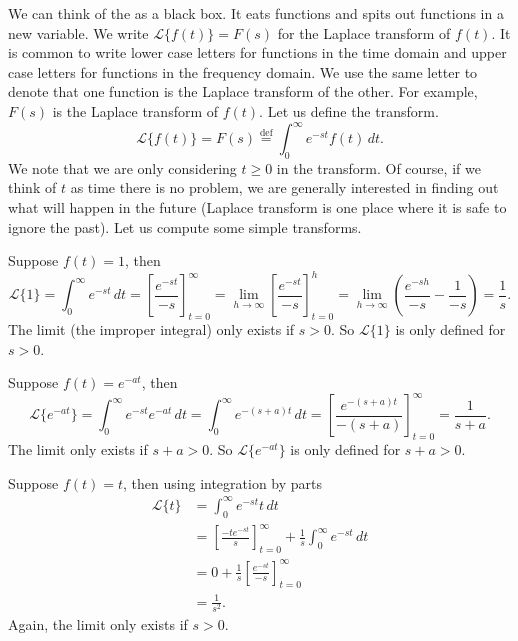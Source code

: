 We can think of the \emph{} as a black box.  It
eats functions and spits out functions in a new variable.  We write
$\mathcal{L} \bigl\{ f(t) \bigr\} = F(s)$ for the Laplace transform of $f(t)$.
It is common to write lower case letters for
functions in the time domain and upper case letters for functions in the
frequency domain.  We use the same letter to denote that one function
is the Laplace transform of the other.  For example, $F(s)$ is the Laplace
transform of $f(t)$.  Let us define the transform.
\begin{equation*}
\mathcal{L} \bigl\{ f(t) \bigr\} =
F(s) \overset{\text{def}}{=} \int_0^\infty e^{-st} f(t) \, dt .
\end{equation*}
We note that we are only considering $t \geq 0$ in the transform.  Of course,
if we think of $t$ as time there is no problem, we are generally interested in
finding out what will happen in the future (Laplace transform is one place
where it is safe to ignore the past).  Let us compute some simple
transforms.

\begin{example}
Suppose $f(t) = 1$, then
\begin{equation*}
\mathcal{L} \{1\} = \int_0^\infty e^{-st} \, dt
=
\left[ \frac{e^{-st}}{-s} \right]_{t=0}^\infty
=
\lim_{h\to\infty}
\left[ \frac{e^{-st}}{-s} \right]_{t=0}^h
=
\lim_{h\to\infty}
\left( \frac{e^{-sh}}{-s} - \frac{1}{-s} \right)
= \frac{1}{s} .
\end{equation*}
The limit (the improper integral) only exists if $s > 0$.  So 
$\mathcal{L} \{1\}$ is only defined for $s > 0$.
\end{example}

\begin{example}
Suppose $f(t) = e^{-at}$, then
\begin{equation*}
\mathcal{L} \bigl\{e^{-at}\bigr\}
= \int_0^\infty e^{-st} e^{-at} \, dt
= \int_0^\infty e^{-(s+a)t} \, dt
=
\left[ \frac{e^{-(s+a)t}}{-(s+a)} \right]_{t=0}^\infty
= \frac{1}{s+a} .
\end{equation*}
The limit only exists if $s+a > 0$.  So 
$\mathcal{L} \bigl\{e^{-at}\bigr\}$ is only defined for $s+a > 0$.
\end{example}

\begin{example}
Suppose $f(t) = t$, then using integration by parts
\begin{equation*}
\begin{split}
\mathcal{L} \{t\}
& = \int_0^\infty e^{-st} t \, dt \\
& =
\left[ \frac{-te^{-st}}{s} \right]_{t=0}^\infty
+
\frac{1}{s}
\int_0^\infty e^{-st} \,dt \\
& =
0
+
\frac{1}{s}
\left[ \frac{e^{-st}}{-s} \right]_{t=0}^\infty \\
& =
\frac{1}{s^2} .
\end{split}
\end{equation*}
Again, the limit only exists if $s > 0$.
\end{example}

